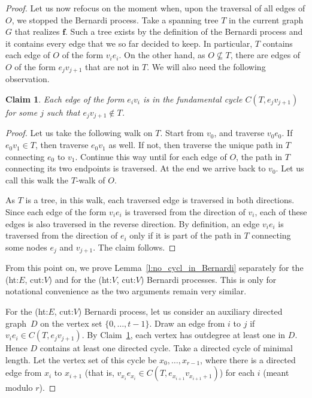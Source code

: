 \documentclass[10pt]{amsart}
\newtheorem{claim}[theo]{Claim}
\theoremstyle{definition}\newtheorem{defi}[theo]{Definition}
\theoremstyle{remark}\newtheorem{rema}[theo]{Remark}
\begin{document}
\begin{proof}
Let us now refocus on the moment when, upon the traversal of all edges of $O$, we stopped the Bernardi process. Take a spanning tree $T$ in the current graph $G$ that realizes $\mathbf f$. Such a tree exists by the definition of the Bernardi process and it contains every edge that we so far decided to keep. In particular, $T$ contains each edge of $O$ of the form $v_ie_i$. On the other hand, as $O\not\subseteq T$, there are edges of $O$ of the form $e_jv_{j+1}$ that are not in $T$. We will also need the following observation.

\begin{claim}\label{p:each_edge_in_base_cut}
	Each edge of the form $e_iv_i$ is in the fundamental cycle $C(T,e_jv_{j+1})$ for some $j$ such that $e_jv_{j+1}\notin T$.
\end{claim}

\begin{proof}
Let us take the following walk on $T$. Start from $v_0$, and traverse $v_0e_0$. If $e_0v_1\in T$, then traverse $e_0v_1$ as well. If not, then traverse the unique path in $T$ connecting $e_0$ to $v_1$. Continue this way until for each edge of $O$, the path in $T$ connecting its two endpoints is traversed. At the end we arrive back to $v_0$. Let us call this walk the $T$-walk of $O$.

As $T$ is a tree, in this walk, each traversed edge is traversed in both directions. Since each edge of the form $v_ie_i$ is traversed from the direction of $v_i$, each of these edges is also traversed in the reverse direction. By definition, an edge $v_ie_i$ is traversed from the direction of $e_i$ only if it is part of the path in $T$ connecting some nodes $e_j$ and $v_{j+1}$. The claim follows.
\end{proof}

From this point on, we prove Lemma~\ref{l:no_cycl_in_Bernardi} separately for the (ht:$E$, cut:$V$) and for the (ht:$V$, cut:$V$) Bernardi processes. This is only for notational convenience as the two arguments remain very similar.

For the (ht:$E$, cut:$V$) Bernardi process, let us consider an auxiliary directed graph~$D$ on the vertex set $\{0,\dots,t-1\}$. Draw an edge from $i$ to $j$ if $v_{i}e_{i}\in C(T,e_jv_{j+1})$. By Claim~\ref{p:each_edge_in_base_cut}, each vertex has outdegree at least one in $D$. Hence $D$ contains at least one directed cycle. Take a directed cycle of minimal length. Let the vertex set of this cycle be $x_0,\dots,x_{r-1}$, where there is a directed edge from $x_i$ to $x_{i+1}$ (that is, $v_{x_i}e_{x_i}\in C(T,e_{x_{i+1}}v_{x_{i+1}+1})$) for each $i$ (meant modulo $r$).


\end{proof}
\end{document}
